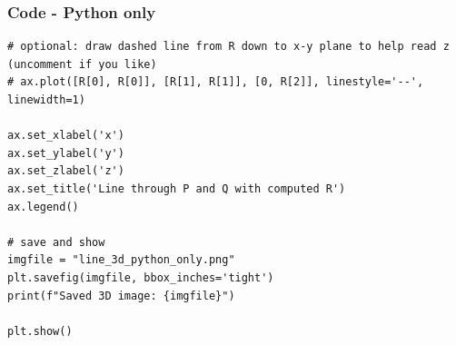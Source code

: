 \documentclass{beamer}
\theoremstyle{remark}
\numberwithin{equation}{section}
\begin{document}
\begin{frame}[fragile]
\frametitle{Code - Python only}
\begin{lstlisting}
# optional: draw dashed line from R down to x-y plane to help read z (uncomment if you like)
# ax.plot([R[0], R[0]], [R[1], R[1]], [0, R[2]], linestyle='--', linewidth=1)

ax.set_xlabel('x')
ax.set_ylabel('y')
ax.set_zlabel('z')
ax.set_title('Line through P and Q with computed R')
ax.legend()

# save and show
imgfile = "line_3d_python_only.png"
plt.savefig(imgfile, bbox_inches='tight')
print(f"Saved 3D image: {imgfile}")

plt.show()
\end{lstlisting}
\end{frame}
\end{document}
